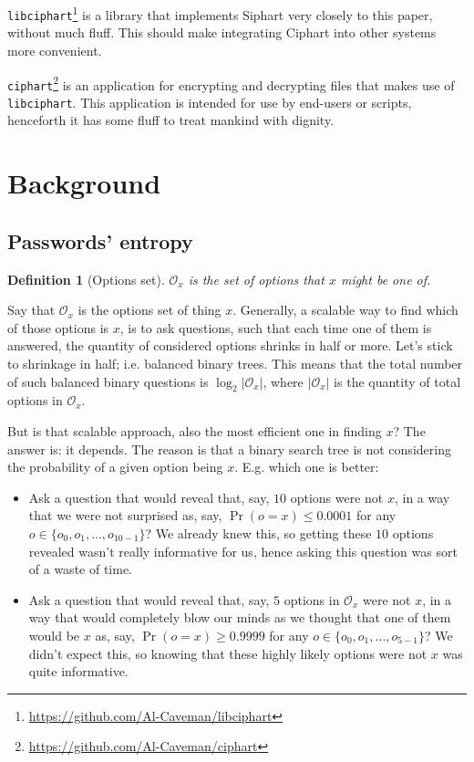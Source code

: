 \documentclass[twocolumn]{article}
\newtheorem{definition}{Definition}[section]
\begin{document}
\texttt{libciphart}\footnote{\url{https://github.com/Al-Caveman/libciphart}}
is a library that implements Siphart very closely to this paper, without
much fluff.  This should make integrating Ciphart into other systems more
convenient.

\texttt{ciphart}\footnote{\url{https://github.com/Al-Caveman/ciphart}} is
an application for encrypting and decrypting files that makes use of
\texttt{libciphart}.  This application is intended for use by end-users or
scripts, henceforth it has some fluff to treat mankind with dignity.

\break
\tableofcontents

\section{Background}
\subsection{Passwords' entropy}\label{sec_pass_entropy}
\begin{definition}[Options set]
    $\mathcal{O}_x$ is the set of options that $x$ might be one of.
\end{definition}

Say that $\mathcal{O}_x$ is the options set of thing $x$.  Generally, a
scalable way to find which of those options is $x$, is to ask questions,
such that each time one of them is answered, the quantity of considered
options shrinks in half or more.  Let's stick to shrinkage in half; i.e.
balanced binary trees.  This means that the total number of such balanced
binary questions is $\log_2 |\mathcal{O}_x|$, where $|\mathcal{O}_x|$ is
the quantity of total options in $\mathcal{O}_x$.

But is that scalable approach, also the most efficient one in finding $x$?
The answer is: it depends.  The reason is that a binary search tree is not
considering the probability of a given option being $x$.  E.g. which one is
better:
\begin{itemize}
    \item Ask a question that would reveal that, say, $10$ options were not
    $x$, in a way that we were not surprised  as, say, $\Pr(o = x) \le
    0.0001$ for any $o \in \{o_0, o_1, \ldots, o_{10-1}\}$?  We already
    knew this, so getting these $10$ options revealed wasn't really
    informative for us, hence asking this question was sort of a waste of
    time.

    \item Ask a question that would reveal that, say, $5$ options in
    $\mathcal{O}_x$ were not $x$, in a way that would completely blow our
    minds as we thought that one of them would be $x$ as, say, $\Pr(o = x)
    \ge 0.9999$ for any $o \in \{o_0, o_1, \ldots, o_{5-1}\}$?  We didn't
    expect this, so knowing that these highly likely options were not $x$
    was quite informative.
\end{itemize}
\end{document}
